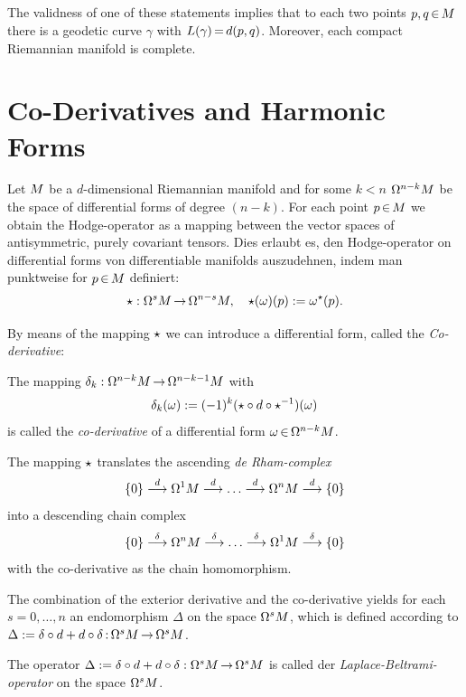 \documentclass[11pt,twoside]{article}
\begin{document}
\subparagraph{}
The validness of one of these statements implies
that to each two points $p,q {\,\in\,} {M}$ there is a geodetic curve
$\gamma$ with $L(\gamma) {\,=\,} d(p,q)$.
Moreover,
each compact Riemannian manifold is complete.

\section{Co-Derivatives and Harmonic Forms}
Let ${M}$ be a $d$-dimens\-ional Riemannian manifold and for some $k < n$
$\Omega^{n-k} {M}$ be the space of differential forms of degree $(n-k)$.
For each point $p {\,\in\,} {M}$ we obtain the Hodge-operator as a mapping
between the vector spaces of antisymmetric, purely covariant tensors.
Dies erlaubt es, den Hodge-operator on differential forms von
differentiable manifolds auszudehnen,
indem man punktweise for $p {\,\in\,} {M}$ definiert:
\[
\star: \Omega^s {M} {\,\to\,} \Omega^{n-s} {M}, \quad
\star(\omega)(p) := \omega^\star(p).
\]

By means of the mapping $\star$ we can introduce a differential form,
called the \textit{Co-derivative}:

\begin{definition}
The mapping $\delta_k:\Omega^{n-k} {M} {\,\to\,} \Omega^{n-k-1} {M}$ with
\[
\delta_k(\omega) := (-1)^k (\star \circ d \circ \star^{-1})(\omega)
\]
is called the \textit{co-derivative}
of a differential form $\omega {\,\in\,} \Omega^{n-k} {M}$.
\end{definition}

The mapping $\star$ translates the ascending
\textit{de Rham-complex}
\[
\{0\}
  \stackrel{d}{\longrightarrow} \Omega^1 {M}
  \stackrel{d}{\longrightarrow} \ldots
  \stackrel{d}{\longrightarrow} \Omega^n {M}
  \stackrel{d}{\longrightarrow}
\{0\}
\]
into a descending chain complex
\[
\{0\}
  \stackrel{\delta}{\longrightarrow} \Omega^n {M}
  \stackrel{\delta}{\longrightarrow} \ldots
  \stackrel{\delta}{\longrightarrow} \Omega^1 {M}
  \stackrel{\delta}{\longrightarrow}
\{0\}
\]
with the co-derivative as the chain homomorphism.

The combination of the exterior derivative and the co-derivative
yields for each
$s=0,\ldots,n$ an endomorphism $\Delta$ on the space $\Omega^s {M}$,
which is defined according to
$\Delta := \delta \circ d + d \circ \delta {\,:\,}
\Omega^s {M} {\,\to\,} \Omega^s {M}$.

\begin{definition}
The operator
$\Delta := \delta \circ d + d \circ \delta :\Omega^s {M} {\,\to\,} \Omega^s {M}$
is called der \textit{Laplace-Beltrami-operator} on the space $\Omega^s {M}$.
\end{definition}
\end{document}
